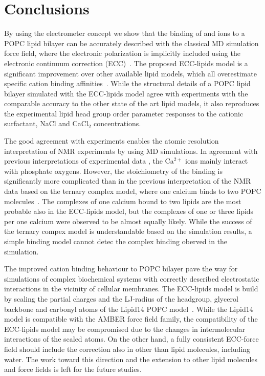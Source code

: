\documentclass[aip,jcp,twocolumn]{revtex4}
\begin{document}
\section{Conclusions}
By using the electrometer concept we show that the binding of  and  ions
to a POPC lipid bilayer can be accurately described with the classical MD simulation 
force field, where the electronic polarization is implicitly included using 
the electronic continuum correction (ECC)~\cite{leontyev11}.
The proposed ECC-lipids model is a significant improvement over 
other available lipid models, which all overestimate specific cation binding affinities~\cite{catte16}.  
While the structural details of a POPC lipid bilayer simulated with the ECC-lipids
model agree with experiments with the comparable accuracy to the other state of the art lipid models,
it also reproduces the experimental lipid head group order parameter responses to
the cationic surfactant, NaCl and CaCl$_2$ concentrations. 

The good agreement with experiments enables the atomic resolution 
interpretation of NMR experiments by using MD simulations.
In agreement with previous interpretations of experimental data \cite{hauser76,hauser78,herbette84,binder02},
the Ca$^{2+}$ ions mainly interact with phosphate oxygens.
However, the stoichiometry of the binding is significantly more complicated 
than in the previous interpretation of the NMR data based on 
the ternary complex model, where one calcium binds to two POPC molecules~\cite{altenbach84}.
The complexes of one calcium bound to two lipids are the most probable also in the
ECC-lipids model, but the complexes of one or three lipids per one calcium
were observed to be almost equally likely. While the success of the ternary
compex model is understandable based on the simulation results,
a simple binding model cannot detec the complex binding
oberved in the simulation.

The improved cation binding behaviour to POPC bilayer pave the way for
simulations of complex biochemical systems with correctly described
electrostatic interactions in the vicinity of cellular membranes.
The ECC-lipids model is build by scaling the partial charges and
the LJ-radius of the headgroup, glycerol backbone and carbonyl atoms of
the Lipid14 POPC model~\cite{dickson14}. While the Lipid14 model
is compatible with the AMBER force field family, the compatibility of
the ECC-lipids model may be compromised due to the changes in intermolecular
interactions of the scaled atoms. On the other hand, a fully consistent
ECC-force field should include the correction also in other than lipid
molecules, including water. The work toward this direction and the extension
to other lipid molecules and force fields is left for the future studies.
\end{document}
